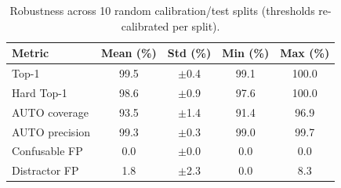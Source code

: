 \begin{table}[t]
\caption{Robustness across 10 random calibration/test splits (thresholds re-calibrated per split).}
\label{tab:robustness}
\centering
\footnotesize
\setlength{\tabcolsep}{3.5pt}
\begin{tabular}{lcccc}
\toprule
Metric & Mean (\%) & Std (\%) & Min (\%) & Max (\%) \\
\midrule
Top-1 & 99.5 & $\pm$0.4 & 99.1 & 100.0 \\
Hard Top-1 & 98.6 & $\pm$0.9 & 97.6 & 100.0 \\
AUTO coverage & 93.5 & $\pm$1.4 & 91.4 & 96.9 \\
AUTO precision & 99.3 & $\pm$0.3 & 99.0 & 99.7 \\
Confusable FP & 0.0 & $\pm$0.0 & 0.0 & 0.0 \\
Distractor FP & 1.8 & $\pm$2.3 & 0.0 & 8.3 \\
\bottomrule
\end{tabular}
\end{table}

